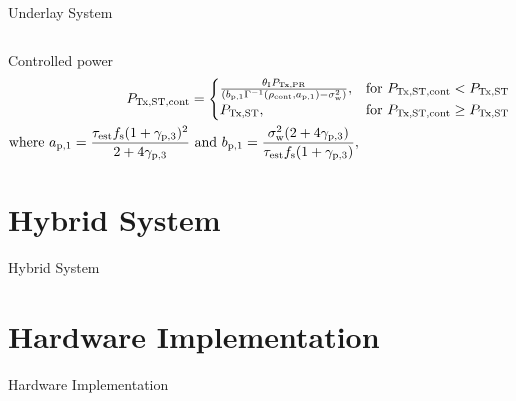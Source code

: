 \documentclass[16pt]{beamer}
\begin{document}
\begin{frame}[t]{Underlay System}
\begin{columns}
\begin{column}{0.55\columnwidth}
\begin{center}
{
                }
		\end{center}
		\end{column}
	\end{columns}
	\begin{block}{\scriptsize Controlled power} 
		\vspace{-3.5mm}
		\begin{align*}
			P_{\text{Tx,ST,cont}} &= 
			\begin{cases} 
				\frac{\theta_{\text{I}} P_{\text{Tx,PR}}}{ \left(b_{\text{p,1}} \Gamma^{-1}(\rho_{\text{cont}}, a_{\text{p,1}}) - \sigma^2_{\text{w}}  \right)}, & \mbox{for } P_{\text{Tx,ST,cont}} < P_{\text{Tx,ST}} \\
				P_{\text{Tx,ST}}, & \mbox{for } P_{\text{Tx,ST,cont}} \ge P_{\text{Tx,ST}}
				\end{cases} \\
				\text{where  } a_{\text{p,1}} = \frac{\tau_{\text{est}} f_{\text{s}} (1 + {\gamma}_{\text{p,3}})^2}{2 + 4 {\gamma}_{\text{p,3}}} &\text{ and } b_{\text{p,1}} = \frac{\sigma^2_{\text{w}} (2 + 4 {\gamma}_{\text{p,3}})}{\tau_{\text{est}} f_{\text{s}} (1 + {\gamma}_{\text{p,3}})},
			\end{align*}
	\end{block}
\end{frame}


\section{Hybrid System}
\begin{frame}[t]{Hybrid System}
\end{frame}


\section{Hardware Implementation}
\begin{frame}[t]{Hardware Implementation}
\end{frame}
\end{document}
